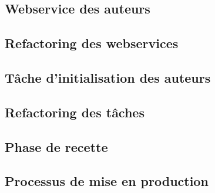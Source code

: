 \subsection{Webservice des auteurs}

\subsection{Refactoring des webservices}

\subsection{Tâche d'initialisation des auteurs}

\subsection{Refactoring des tâches}

\subsection{Phase de recette}

\subsection{Processus de mise en production}